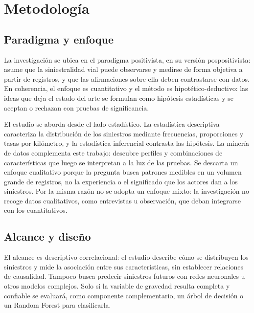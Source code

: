 \documentclass[12pt,letterpaper]{article}
\begin{document}
\clearpage
\hypertarget{metodologuxeda}{%
\section{Metodología}\label{metodologuxeda}}

\hypertarget{paradigma-y-enfoque}{%
\subsection{Paradigma y enfoque}\label{paradigma-y-enfoque}}

La investigación se ubica en el paradigma positivista, en su versión
pospositivista: asume que la siniestralidad vial puede observarse y
medirse de forma objetiva a partir de registros, y que las afirmaciones
sobre ella deben contrastarse con datos. En coherencia, el enfoque es
cuantitativo y el método es hipotético-deductivo: las ideas que deja el
estado del arte se formulan como hipótesis estadísticas y se aceptan o
rechazan con pruebas de significancia.

El estudio se aborda desde el lado estadístico. La estadística
descriptiva caracteriza la distribución de los siniestros mediante
frecuencias, proporciones y tasas por kilómetro, y la estadística
inferencial contrasta las hipótesis. La minería de datos complementa
este trabajo: descubre perfiles y combinaciones de características que
luego se interpretan a la luz de las pruebas. Se descarta un enfoque
cualitativo porque la pregunta busca patrones medibles en un volumen
grande de registros, no la experiencia o el significado que los actores
dan a los siniestros. Por la misma razón no se adopta un enfoque mixto:
la investigación no recoge datos cualitativos, como entrevistas u
observación, que deban integrarse con los cuantitativos.

\hypertarget{alcance-y-diseuxf1o}{%
\subsection{Alcance y diseño}\label{alcance-y-diseuxf1o}}

El alcance es descriptivo-correlacional: el estudio describe cómo se
distribuyen los siniestros y mide la asociación entre sus
características, sin establecer relaciones de causalidad. Tampoco busca
predecir siniestros futuros con redes neuronales u otros modelos
complejos. Solo si la variable de gravedad resulta completa y confiable
se evaluará, como componente complementario, un árbol de decisión o un
Random Forest para clasificarla.
\end{document}
